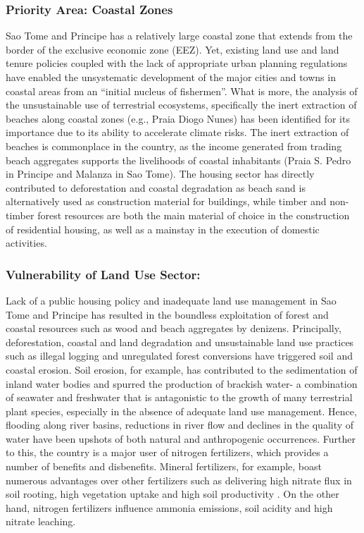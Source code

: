 \documentclass[
]{book}
\begin{document}
\hypertarget{priority-area-coastal-zones-1}{%
\subsubsection{Priority Area: Coastal Zones}\label{priority-area-coastal-zones-1}}

Sao Tome and Principe has a relatively large coastal zone that extends from the border of the exclusive economic zone (EEZ). Yet, existing land use and land tenure policies coupled with the lack of appropriate urban planning regulations have enabled the unsystematic development of the major cities and towns in coastal areas from an ``initial nucleus of fishermen''. What is more, the analysis of the unsustainable use of terrestrial ecosystems, specifically the inert extraction of beaches along coastal zones (e.g., Praia Diogo Nunes) has been identified for its importance due to its ability to accelerate climate risks. The inert extraction of beaches is commonplace in the country, as the income generated from trading beach aggregates supports the livelihoods of coastal inhabitants (Praia S. Pedro in Principe and Malanza in Sao Tome). The housing sector has directly contributed to deforestation and coastal degradation as beach sand is alternatively used as construction material for buildings, while timber and non-timber forest resources are both the main material of choice in the construction of residential housing, as well as a mainstay in the execution of domestic activities.

\hypertarget{vulnerability-of-land-use-sector-1}{%
\subsubsection{Vulnerability of Land Use Sector:}\label{vulnerability-of-land-use-sector-1}}

Lack of a public housing policy and inadequate land use management in Sao Tome and Principe has resulted in the boundless exploitation of forest and coastal resources such as wood and beach aggregates by denizens. Principally, deforestation, coastal and land degradation and unsustainable land use practices such as illegal logging and unregulated forest conversions have triggered soil and coastal erosion. Soil erosion, for example, has contributed to the sedimentation of inland water bodies and spurred the production of brackish water- a combination of seawater and freshwater that is antagonistic to the growth of many terrestrial plant species, especially in the absence of adequate land use management. Hence, flooding along river basins, reductions in river flow and declines in the quality of water have been upshots of both natural and anthropogenic occurrences. Further to this, the country is a major user of nitrogen fertilizers, which provides a number of benefits and disbenefits. Mineral fertilizers, for example, boast numerous advantages over other fertilizers such as delivering high nitrate flux in soil rooting, high vegetation uptake and high soil productivity . On the other hand, nitrogen fertilizers influence ammonia emissions, soil acidity and high nitrate leaching.
\end{document}
